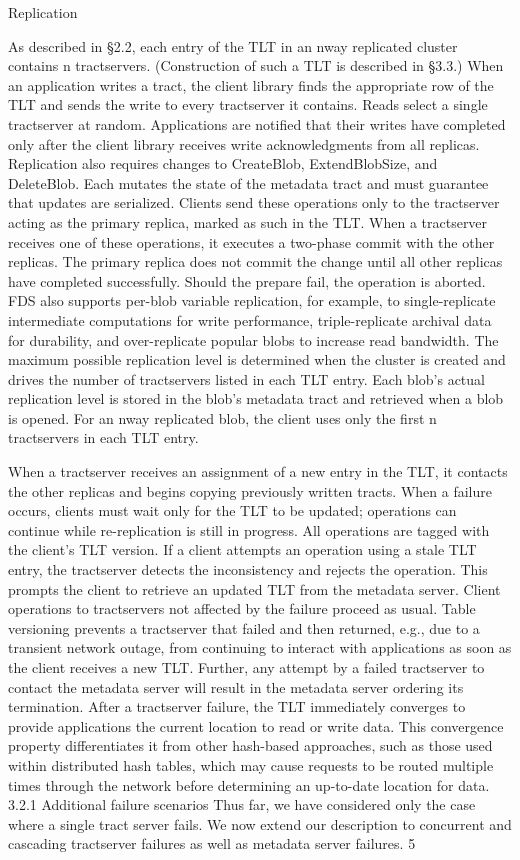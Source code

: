 Replication

As described in §2.2, each entry of the TLT in an nway replicated cluster contains n tractservers. (Construction of such a TLT is described in §3.3.) When an application writes a tract, the client library finds the appropriate row of the TLT and sends the write to every tractserver it contains. Reads select a single tractserver at
random. Applications are notified that their writes have
completed only after the client library receives write acknowledgments from all replicas.
Replication also requires changes to CreateBlob,
ExtendBlobSize, and DeleteBlob. Each mutates the
state of the metadata tract and must guarantee that updates are serialized. Clients send these operations only
to the tractserver acting as the primary replica, marked
as such in the TLT. When a tractserver receives one of
these operations, it executes a two-phase commit with the
other replicas. The primary replica does not commit the
change until all other replicas have completed successfully. Should the prepare fail, the operation is aborted.
FDS also supports per-blob variable replication, for
example, to single-replicate intermediate computations
for write performance, triple-replicate archival data for
durability, and over-replicate popular blobs to increase
read bandwidth. The maximum possible replication level
is determined when the cluster is created and drives the
number of tractservers listed in each TLT entry. Each
blob’s actual replication level is stored in the blob’s metadata tract and retrieved when a blob is opened. For an nway replicated blob, the client uses only the first n tractservers in each TLT entry.

When a tractserver receives an assignment of a new
entry in the TLT, it contacts the other replicas and begins
copying previously written tracts. When a failure occurs,
clients must wait only for the TLT to be updated; operations can continue while re-replication is still in progress.
All operations are tagged with the client’s TLT version. If a client attempts an operation using a stale TLT
entry, the tractserver detects the inconsistency and rejects
the operation. This prompts the client to retrieve an updated TLT from the metadata server. Client operations to
tractservers not affected by the failure proceed as usual.
Table versioning prevents a tractserver that failed and
then returned, e.g., due to a transient network outage,
from continuing to interact with applications as soon as
the client receives a new TLT. Further, any attempt by a
failed tractserver to contact the metadata server will result in the metadata server ordering its termination.
After a tractserver failure, the TLT immediately converges to provide applications the current location to read
or write data. This convergence property differentiates it
from other hash-based approaches, such as those used
within distributed hash tables, which may cause requests
to be routed multiple times through the network before
determining an up-to-date location for data.
3.2.1 Additional failure scenarios
Thus far, we have considered only the case where a
single tract server fails. We now extend our description
to concurrent and cascading tractserver failures as well
as metadata server failures.
5

